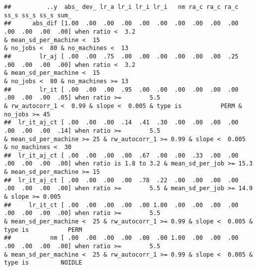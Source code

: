 \documentclass[
]{article}
\begin{document}
\begin{verbatim}
##          ..y  abs_ dev_ lr_a lr_i lr_i lr_i   nm ra_c ra_c ra_c ss_s ss_s ss_s sum_                                                                                                                                                                                                               
##      abs_dif [1.00  .00  .00  .00  .00  .00  .00  .00  .00  .00  .00  .00  .00  .00] when ratio <  3.2                                  & mean_sd_per_machine <  15                                                                   & no_jobs <  80 & no_machines <  13                         
##        lr_aj [ .00  .00  .75  .00  .00  .00  .00  .00  .00  .25  .00  .00  .00  .00] when ratio <  3.2                                  & mean_sd_per_machine <  15                                                                   & no_jobs <  80 & no_machines >= 13                         
##        lr_it [ .00  .00  .00  .95  .00  .00  .00  .00  .00  .00  .00  .00  .00  .05] when ratio >=        5.5                                                       & rw_autocorr_1 <  0.99 & slope <  0.005 & type is           PERM & no_jobs >= 45                                             
##  lr_it_aj_ct [ .00  .00  .00  .14  .41  .30  .00  .00  .00  .00  .00  .00  .00  .14] when ratio >=        5.5                           & mean_sd_per_machine >= 25 & rw_autocorr_1 >= 0.99 & slope <  0.005                                          & no_machines <  30                         
##  lr_it_aj_ct [ .00  .00  .00  .00  .67  .00  .00  .33  .00  .00  .00  .00  .00  .00] when ratio is 1.8 to 3.2 & mean_sd_per_job >= 15.3 & mean_sd_per_machine >= 15                                                                                                                               
##  lr_it_aj_ct [ .00  .00  .00  .00  .78  .22  .00  .00  .00  .00  .00  .00  .00  .00] when ratio >=        5.5 & mean_sd_per_job >= 14.9                                                     & slope >= 0.005                                                                                      
##     lr_it_ct [ .00  .00  .00  .00  .00 1.00  .00  .00  .00  .00  .00  .00  .00  .00] when ratio >=        5.5                           & mean_sd_per_machine <  25 & rw_autocorr_1 >= 0.99 & slope <  0.005 & type is           PERM                                                             
##           nm [ .00  .00  .00  .00  .00  .00 1.00  .00  .00  .00  .00  .00  .00  .00] when ratio >=        5.5                           & mean_sd_per_machine <  25 & rw_autocorr_1 >= 0.99 & slope <  0.005 & type is         NOIDLE                                                             

\end{verbatim}
\end{document}
